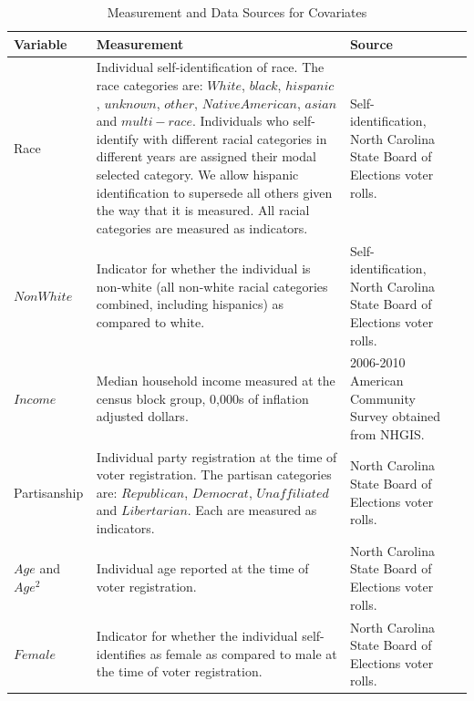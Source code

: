 \documentclass{cup_PSRM}
\begin{document}
\begin{table}[h!]\centering \footnotesize
\def\sym#1{\ifmmode^{#1}\else\(^{#1}\)\fi}
	\caption{\small Measurement and Data Sources for Covariates}\label{table_covariates}
	\smallskip
	\begin{tabular}{@{\extracolsep{5pt}}l*{3}{l}}
	\noalign{\smallskip}\hline\hline\noalign{\smallskip}\noalign{\smallskip}
	Variable & Measurement & Source   \\
	\midrule
	Race & \multicolumn{1}{p{2.4in}}{Individual self-identification of race.  The race categories are: $White$, $black$, $hispanic$, $unknown$, $other$, $Native American$, $asian$ and $multi-race$.  Individuals who self-identify with different racial categories in different years are assigned their modal selected category.  We allow hispanic identification to supersede all others given the way that it is measured.  All racial categories are measured as indicators.} & \multicolumn{1}{p{2.0in}}{Self-identification, North Carolina State Board of Elections voter rolls.} \\
	\noalign{\smallskip}\noalign{\smallskip}
	$NonWhite$ &  \multicolumn{1}{p{2.4in}}{Indicator for whether the individual is non-white (all non-white racial categories combined, including hispanics) as compared to white.} & \multicolumn{1}{p{2.0in}}{Self-identification, North Carolina State Board of Elections voter rolls.}\\
	\noalign{\smallskip}\noalign{\smallskip}
	$Income$ &  \multicolumn{1}{p{2.4in}}{Median household income measured at the census block group, 0,000s of inflation adjusted dollars.} & \multicolumn{1}{p{2.0in}}{2006-2010 American Community Survey obtained from NHGIS.}\\
	\noalign{\smallskip}\noalign{\smallskip}
	Partisanship & \multicolumn{1}{p{2.4in}}{Individual party registration at the time of voter registration.  The partisan categories are: $Republican$, $Democrat$, $Unaffiliated$ and $Libertarian$.  Each are measured as indicators.} & \multicolumn{1}{p{2.0in}}{North Carolina State Board of Elections voter rolls.} \\
	\noalign{\smallskip}\noalign{\smallskip}
	$Age$ and $Age^{2}$ & \multicolumn{1}{p{2.4in}}{Individual age reported at the time of voter registration.} & \multicolumn{1}{p{2.0in}}{North Carolina State Board of Elections voter rolls.} \\
	\noalign{\smallskip}\noalign{\smallskip}
	$Female$ & \multicolumn{1}{p{2.4in}}{Indicator for whether the individual self-identifies as female as compared to male at the time of voter registration.} & \multicolumn{1}{p{2.0in}}{North Carolina State Board of Elections voter rolls.} \\

\end{tabular}
\end{table}
\end{document}

